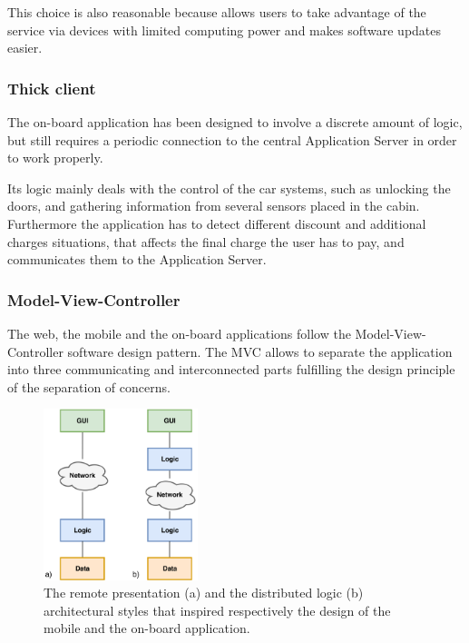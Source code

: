 This choice is also reasonable because allows users to take advantage of the service via devices with limited computing power and makes software updates easier.

\subsubsection{Thick client}
The on-board application has been designed to involve a discrete amount of logic, but still requires a periodic connection to the central Application Server in order to work properly.

Its logic mainly deals with the control of the car systems, such as unlocking the doors, and gathering information from several sensors placed in the cabin. Furthermore the application has to detect different discount and additional charges situations, that affects the final charge the user has to pay, and communicates them to the Application Server.

\subsubsection{Model-View-Controller}
The web, the mobile and the on-board applications follow the Model-View-Controller software design pattern. The MVC allows to separate the application into three communicating and interconnected parts fulfilling the design principle of the separation of concerns.


\begin{figure}[H]
\begin{center}
		\includegraphics[width=0.4\textwidth]{./arch_design/diagrams/architectural_patterns.png}
		\caption{The remote presentation (a) and the distributed logic (b) architectural styles that inspired respectively the design of the mobile and the on-board application.}
		\label{er_dg}
\end{center}
\end{figure}